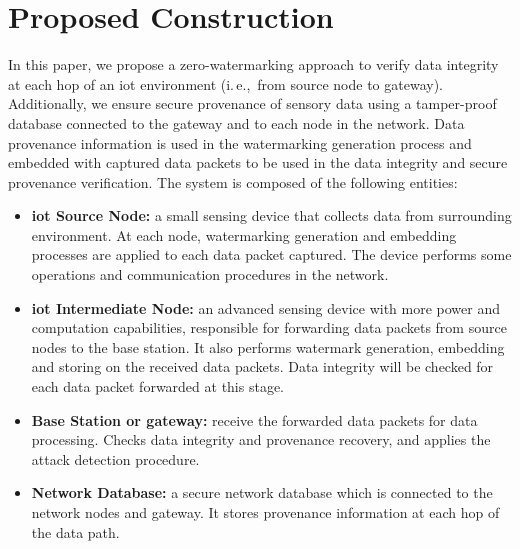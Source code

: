\documentclass{llncs}
\newcommand{\ie}{i.\,e.,~}
\begin{document}
\begin{table*}[!htbp]
\begin{tabular}{ p{2cm}|p{10cm}  }
\hline
\end{tabular}
\label{tab:table1}
\end{table*}

\section{Proposed Construction}
\label{sec:sysmodel}
In this paper, we propose a zero-watermarking approach to verify data integrity at each hop of an \gls*{iot} environment (\ie from source node to gateway). Additionally, we ensure secure provenance of sensory data using a tamper-proof database connected to the gateway and to each node in the network. Data provenance information is used in the watermarking generation process and embedded with captured data packets to be used in the data integrity and secure provenance verification. The system is composed of the following entities:
\begin{itemize}
    \item \textbf{\gls*{iot} Source Node:} a small sensing device that collects data from surrounding environment. At each node, watermarking generation and embedding processes are applied to each data packet captured. The device performs some operations and communication procedures in the network.
    \item \textbf{\gls*{iot} Intermediate Node:} an advanced sensing device with more power and computation capabilities, responsible for forwarding data packets from source nodes to the base station. It also performs watermark generation, embedding and storing on the received data packets. Data integrity will be checked for each data packet forwarded at this stage.
    \item \textbf{Base Station or gateway:} receive the forwarded data packets for data processing. Checks data integrity and provenance recovery, and applies the attack detection procedure.
    \item \textbf{Network Database:} a secure network database which is connected to the network nodes and gateway. It stores provenance information at each hop of the data path. 
\end{itemize}
\end{document}
